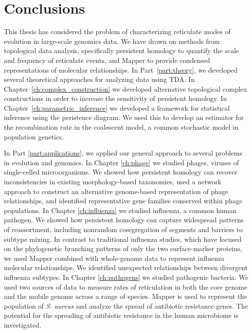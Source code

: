 
\chapter{Conclusions}
\label{ch:conclusions}

This thesis has considered the problem of characterizing reticulate modes of evolution in large-scale genomics data.
We have drawn on methods from topological data analysis, specifically persistent homology to quantify the scale and frequency of reticulate events, and Mapper to provide condensed representations of molecular relationships.
In Part~\ref{part:theory}, we developed several theoretical approaches for analyzing data using TDA. 
In Chapter~\ref{ch:complex_construction} we developed alternative topological complex constructions in order to increase the sensitivity of persistent homology.
In Chapter~\ref{ch:parametric_inference} we developed a framework for statistical inference using the peristence diagram.
We used this to develop an estimator for the recombination rate in the coalescent model, a common stochastic model in population genetics.

In Part \ref{part:applications}, we applied our general approach to several problems in evolution and genomics.
In Chapter \ref{ch:phage} we studied phages, viruses of single-celled microorganisms.
We showed how persistent homology can recover inconsistencies in existing morphology-based taxonomies, used a network approach to construct an alternative genome-based representation of phage relationships, and identified representative gene families conserved within phage populations.
In Chapter \ref{ch:influenza} we studied influenza, a common human pathogen.
We showed how persistent homology can capture widespread patterns of reassortment, including nonrandom cosegregation of segments and barriers to subtype mixing.
In contrast to traditional influenza studies, which have focused on the phylogenetic branching patterns of only the two surface-marker proteins, we used Mapper combined with whole-genome data to represent influenza molecular relationships.
We identified unexpected relationships between divergent influenza subtypes.
In Chapter \ref{ch:pathogens} we studied pathogenic bacteria.
We used two sources of data to measure rates of reticulation in both the core genome and the mobile genome across a range of species.
Mapper is used to represent the population of \emph{S. aureus} and analyze the spread of antibiotic resistance genes.
The potential for the spreading of antibiotic resistance in the human microbiome is investigated.